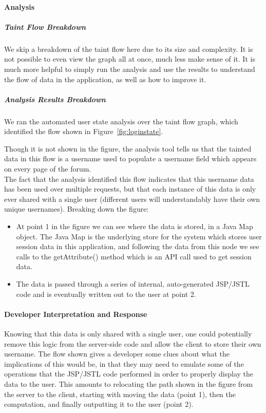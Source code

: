 \documentclass[msc,oneside]{ubcthesis}
\begin{document}
\paragraph{Analysis}
\subparagraph{Taint Flow Breakdown}
We skip a breakdown of the taint flow here due to its size and complexity. It is not possible to even view the graph all at once, much less make sense of it. It is much more helpful to simply run the analysis and use the results to understand the flow of data in the application, as well as how to improve it.

\subparagraph{Analysis Results Breakdown}
We ran the automated user state analysis over the taint flow graph, which identified the flow shown in Figure~\ref{fig:loginstate}. 

Though it is not shown in the figure, the analysis tool tells us that the tainted data in this flow is a username used to populate a username field which appears on every page of the forum.\\

The fact that the analysis identified this flow indicates that this username data has been used over multiple requests, but that each instance of this data is only ever shared with a single user (different users will understandably have their own unique usernames). Breaking down the figure: 

\begin{itemize}
\item At point 1 in the figure we can see where the data is stored, in a Java Map object. The Java Map is the underlying store for the system which stores user session data in this application, and following the data from this node we see calls to the getAttribute() method which is an API call used to get session data.
\item The data is passed through a series of internal, auto-generated JSP/JSTL code and is eventually written out to the user at point 2.
\end{itemize}

\paragraph{Developer Interpretation and Response}
Knowing that this data is only shared with a single user, one could potentially remove this logic from the server-side code and allow the client to store their own username. The flow shown gives a developer some clues about what the implications of this would be, in that they may need to emulate some of the operations that the JSP/JSTL code performed in order to properly display the data to the user. This amounts to relocating the path shown in the figure from the server to the client, starting with moving the data (point 1), then the computation, and finally outputting it to the user (point 2).
\end{document}
